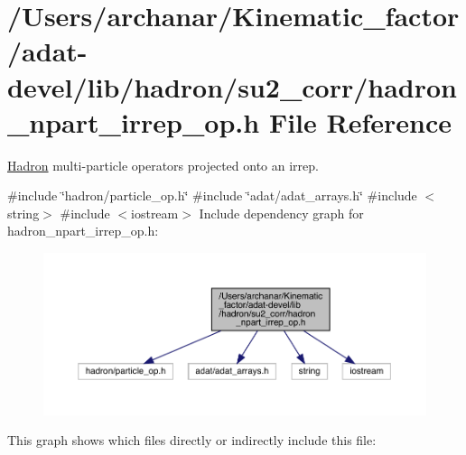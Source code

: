 \hypertarget{adat-devel_2lib_2hadron_2su2__corr_2hadron__npart__irrep__op_8h}{}\section{/\+Users/archanar/\+Kinematic\+\_\+factor/adat-\/devel/lib/hadron/su2\+\_\+corr/hadron\+\_\+npart\+\_\+irrep\+\_\+op.h File Reference}
\label{adat-devel_2lib_2hadron_2su2__corr_2hadron__npart__irrep__op_8h}


\mbox{\hyperlink{namespaceHadron}{Hadron}} multi-\/particle operators projected onto an irrep.  


{\ttfamily \#include \char`\"{}hadron/particle\+\_\+op.\+h\char`\"{}}\newline
{\ttfamily \#include \char`\"{}adat/adat\+\_\+arrays.\+h\char`\"{}}\newline
{\ttfamily \#include $<$string$>$}\newline
{\ttfamily \#include $<$iostream$>$}\newline
Include dependency graph for hadron\+\_\+npart\+\_\+irrep\+\_\+op.\+h\+:
\nopagebreak
\begin{figure}[H]
\begin{center}
\leavevmode
\includegraphics[width=350pt]{d9/d3c/adat-devel_2lib_2hadron_2su2__corr_2hadron__npart__irrep__op_8h__incl}
\end{center}
\end{figure}
This graph shows which files directly or indirectly include this file\+:
\nopagebreak
